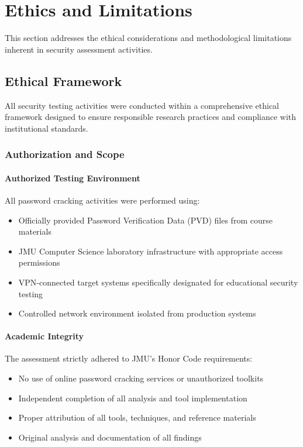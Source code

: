 \section{Ethics and Limitations}

This section addresses the ethical considerations and methodological limitations inherent in security assessment activities.

\subsection{Ethical Framework}

All security testing activities were conducted within a comprehensive ethical framework designed to ensure responsible research practices and compliance with institutional standards.

\subsubsection{Authorization and Scope}

\paragraph{Authorized Testing Environment}
All password cracking activities were performed using:
\begin{itemize}
    \item Officially provided Password Verification Data (PVD) files from course materials
    \item JMU Computer Science laboratory infrastructure with appropriate access permissions
    \item VPN-connected target systems specifically designated for educational security testing
    \item Controlled network environment isolated from production systems
\end{itemize}

\paragraph{Academic Integrity}
The assessment strictly adhered to JMU's Honor Code requirements:
\begin{itemize}
    \item No use of online password cracking services or unauthorized toolkits
    \item Independent completion of all analysis and tool implementation
    \item Proper attribution of all tools, techniques, and reference materials
    \item Original analysis and documentation of all findings
\end{itemize}

